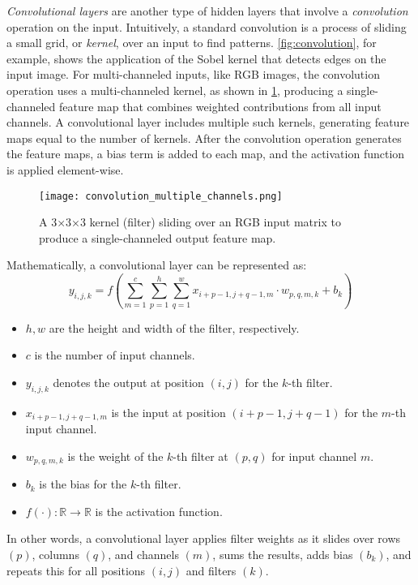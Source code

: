 \textit{Convolutional layers} are another type of hidden layers 
that involve a \textit{convolution} operation on the input. Intuitively, a standard convolution is 
a process of sliding a small grid, or \textit{kernel}, over an input to find patterns. \cref{fig:convolution}, for example, shows 
the application of the Sobel kernel that detects edges on the input image.
For multi-channeled inputs, like RGB images, the convolution operation uses a multi-channeled kernel, as shown in \cref{fig:convolution_multiple_channels}, 
producing a single-channeled feature map that combines weighted contributions from all input channels. 
A convolutional layer includes multiple such kernels, generating feature maps equal to the number of kernels.
After the convolution operation generates the feature maps, a bias term is added to each map, 
and the activation function is applied element-wise.
\begin{figure}[b!]
  \centering
  \texttt{[image: convolution\_multiple\_channels.png]}
  \caption{A 3×3×3 kernel (filter) sliding over an RGB input matrix to produce a single-channeled output feature map.}
  \label{fig:convolution_multiple_channels}
\end{figure}
Mathematically, a convolutional layer can be represented as:
\[
y_{i,j,k} = f \left( \sum_{m=1}^c \sum_{p=1}^h \sum_{q=1}^w x_{i+p-1, j+q-1, m} \cdot w_{p,q,m,k} + b_k \right)
\]

\begin{itemize}
  \item \( h, w \) are the height and width of the filter, respectively.
  \item \( c \) is the number of input channels.
  \item \( y_{i,j,k} \) denotes the output at position \((i, j)\) for the \(k\)-th filter.
  \item \( x_{i+p-1, j+q-1, m} \) is the input at position \((i+p-1, j+q-1)\) for the \(m\)-th input channel.
  \item \( w_{p,q,m,k} \) is the weight of the \(k\)-th filter at \((p, q)\) for input channel \(m\).
  \item \( b_k \) is the bias for the \(k\)-th filter.
  \item \( f(\cdot): \mathbb{R} \to \mathbb{R} \) is the activation function.
\end{itemize}

In other words, a convolutional layer applies filter weights 
as it slides over rows \((p)\), columns \((q)\), and channels \((m)\), 
sums the results, adds bias \((b_k)\), 
and repeats this for all positions \((i, j)\) and filters \((k)\).

